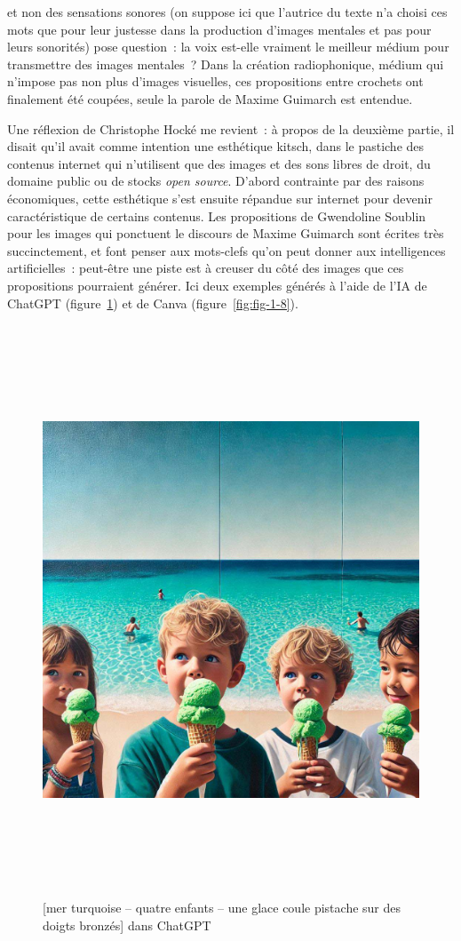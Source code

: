 \documentclass[
]{article}
\begin{document}
et non des sensations sonores (on suppose ici que l'autrice du texte n'a choisi ces mots que pour leur justesse dans la production d'images mentales et pas pour leurs sonorités) pose question~: la voix est-elle vraiment le meilleur médium pour transmettre des images mentales~? Dans la création radiophonique, médium qui n'impose pas non plus d'images visuelles, ces propositions entre crochets ont finalement été coupées, seule la parole de Maxime Guimarch est entendue.

Une réflexion de Christophe Hocké me revient~: à propos de la deuxième partie, il disait qu'il avait comme intention une esthétique kitsch, dans le pastiche des contenus internet qui n'utilisent que des images et des sons libres de droit, du domaine public ou de stocks \emph{open source}. D'abord contrainte par des raisons économiques, cette esthétique s'est ensuite répandue sur internet pour devenir caractéristique de certains contenus. Les propositions de Gwendoline Soublin pour les images qui ponctuent le discours de Maxime Guimarch sont écrites très succinctement, et font penser aux mots-clefs qu'on peut donner aux intelligences artificielles~: peut-être une piste est à creuser du côté des images que ces propositions pourraient générer. Ici deux exemples générés à l'aide de l'IA de ChatGPT (figure~\ref{fig:fig-1-7}) et de Canva (figure~\ref{fig:fig-1-8}).

\begin{figure}
\centering
\includegraphics[width=17cm,height=17cm]{../assets/Pictures/1000000000000400000004005745ADB05D1DDF55.jpg}
\caption{{[}mer turquoise -- quatre enfants -- une glace coule pistache sur des doigts bronzés{]} dans ChatGPT}\label{fig:fig-1-7}
\end{figure}
\end{document}
